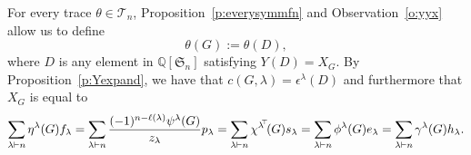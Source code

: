 \documentclass[12pt]{amsart}
\numberwithin{equation}{section}
\newcommand{\sn}{\mathfrak{S}_n}
\newcommand{\qsn}{\mathbb{Q}[\sn]}
\newcommand{\defeq}{:=}
\newcommand{\tr}{{\negthickspace \top \negthickspace}}
\newcommand{\trspace}[1]{\mathcal{T}_{#1}}
\begin{document}
For every trace
$\theta \in \trspace n$, Proposition~\ref{p:everysymmfn} and
Observation~\ref{o:yyx} allow us to define
\begin{equation}\label{eq:thetaG}
  \theta(G) \defeq \theta(D),
\end{equation}
where $D$ is any element in $\qsn$ satisfying $Y(D) = X_G$.
By Proposition~\ref{p:Yexpand}, we have that
$c(G,\lambda) = \epsilon^\lambda(D)$ and furthermore that
$X_G$ is equal to
  \begin{equation}\label{eq:sumXG}
      \sum_{\lambda \vdash n} \eta^\lambda(G)f_\lambda
    = \sum_{\lambda \vdash n}\frac{(-1)^{n-\ell(\lambda)}\psi^\lambda(G)}{z_\lambda}p_\lambda
    = \sum_{\lambda \vdash n} \chi^{\lambda^\tr}(G)s_\lambda
    = \sum_{\lambda \vdash n} \phi^\lambda(G)e_\lambda
    = \sum_{\lambda \vdash n} \gamma^\lambda(G)h_\lambda.
  \end{equation}


\end{document}
